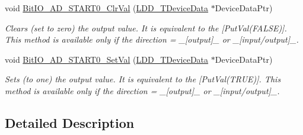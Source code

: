 \begin{DoxyCompactItemize}
void \hyperlink{group___bit_i_o___a_d___s_t_a_r_t0__module_gabe1b30675814b4e233123d237cb770e7}{Bit\-I\-O\-\_\-\-A\-D\-\_\-\-S\-T\-A\-R\-T0\-\_\-\-Clr\-Val} (\hyperlink{group___p_e___types__module_gac5cf1362f1f0e3a2ce71b1bf2276d091}{L\-D\-D\-\_\-\-T\-Device\-Data} $\ast$Device\-Data\-Ptr)
\begin{DoxyCompactList}\small\item\em Clears (set to zero) the output value. It is equivalent to the \mbox{[}Put\-Val(\-F\-A\-L\-S\-E)\mbox{]}. This method is available only if the direction = \-\_\-\mbox{[}output\mbox{]}\-\_\- or \-\_\-\mbox{[}input/output\mbox{]}\-\_\-. \end{DoxyCompactList}\item 
void \hyperlink{group___bit_i_o___a_d___s_t_a_r_t0__module_gac207ab52de850e67991e06cd87754484}{Bit\-I\-O\-\_\-\-A\-D\-\_\-\-S\-T\-A\-R\-T0\-\_\-\-Set\-Val} (\hyperlink{group___p_e___types__module_gac5cf1362f1f0e3a2ce71b1bf2276d091}{L\-D\-D\-\_\-\-T\-Device\-Data} $\ast$Device\-Data\-Ptr)
\begin{DoxyCompactList}\small\item\em Sets (to one) the output value. It is equivalent to the \mbox{[}Put\-Val(\-T\-R\-U\-E)\mbox{]}. This method is available only if the direction = \-\_\-\mbox{[}output\mbox{]}\-\_\- or \-\_\-\mbox{[}input/output\mbox{]}\-\_\-. \end{DoxyCompactList}\end{DoxyCompactItemize}


\subsection{Detailed Description}


